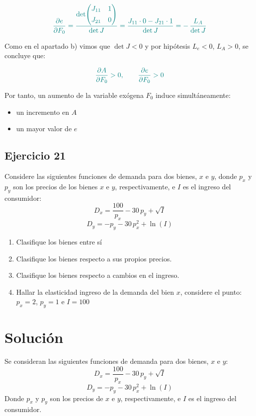 \documentclass{article}
\begin{document}
\[
\color{teal}
\frac{\partial e}{\partial F_0}
= \frac{
\det\!\begin{pmatrix}
J_{11} & 1\\[4pt]
J_{21} & 0
\end{pmatrix}
}{\det J}
= \frac{J_{11}\cdot 0 - J_{21}\cdot 1}{\det J}
= -\,\frac{L_A}{\det J}
\]

Como en el apartado b) vimos que \(\det J < 0\) y por hipótesis \(L_e < 0\), \(L_A > 0\), se concluye que:

\[
\color{teal}
\frac{\partial A}{\partial F_0} > 0,
\qquad
\frac{\partial e}{\partial F_0} > 0
\]

Por tanto, un aumento de la variable exógena \(F_0\) induce simultáneamente:
\begin{itemize}
  \item un incremento en \(A\)
  \item un mayor valor de \(e\)
\end{itemize}
\newpage



\subsection{Ejercicio 21}
Considere las siguientes funciones de demanda para dos bienes, \(x\) e \(y\), donde \(p_x\) y \(p_y\) son los precios de los bienes \(x\) e \(y\), respectivamente, e \(I\) es el ingreso del consumidor:
\[
D_x = \frac{100}{p_x} - 30\,p_y + \sqrt{I}
\]
\[
D_y = -p_y - 30\,p_x^2 + \ln(I)
\]
\begin{enumerate}
    \item Clasifique los bienes entre sí
    \item Clasifique los bienes respecto a sus propios precios.
    \item Clasifique los bienes respecto a cambios en el ingreso.
    \item Hallar la elasticidad ingreso de la demanda del bien \(x\), considere el punto: \(p_x = 2\), \(p_y = 1\) e \(I = 100\)
\end{enumerate}

\newpage
\section*{Solución}
Se consideran las siguientes funciones de demanda para dos bienes, \(x\) e \(y\):
\[
D_x = \frac{100}{p_x} - 30\,p_y + \sqrt{I}
\]
\[
D_y = -p_y - 30\,p_x^2 + \ln(I)
\]
Donde \(p_x\) y \(p_y\) son los precios de \(x\) e \(y\), respectivamente, e \(I\) es el ingreso del consumidor.
\end{document}
